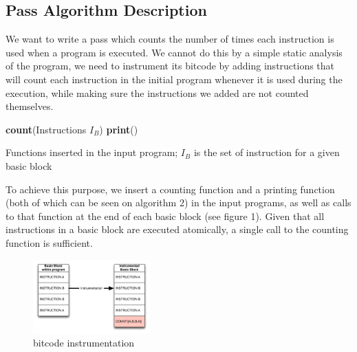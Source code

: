 
\subsection{Pass Algorithm Description}
We want to write a pass which counts the number of times each instruction is used when a program is executed. We cannot do this by a simple static analysis of the program, we need to instrument its bitcode by adding instructions that will count each instruction in the initial program whenever it is used during the execution, while making sure the instructions we added are not counted themselves.

\begin{algorithm}[here]
\textbf{count}(Instructions $I_B$)  
\textbf{print}() 

\caption{Functions inserted in the input program; $I_B$ is the set of instruction for a given basic block}
\end{algorithm}

To achieve this purpose, we insert a counting function and a printing function (both of which can be seen on algorithm 2) in the input programs, as well as calls to that function at the end of each basic block (see figure 1). Given that all instructions in a basic block are executed atomically, a single call to the counting function is sufficient.

\begin{figure}[here]
\includegraphics[width=0.4\textwidth]{instructionbitcode}
\caption{bitcode instrumentation}
\end{figure}

